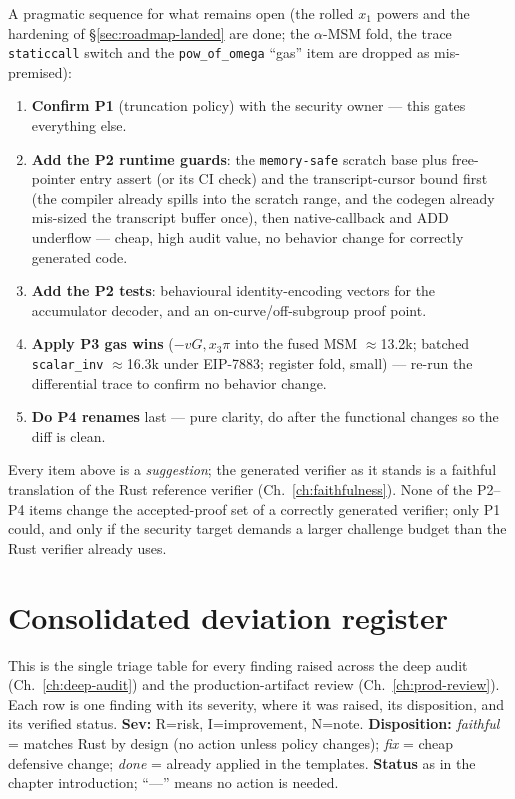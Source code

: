 A pragmatic sequence for what remains open (the rolled $x_1$ powers and
the hardening of \S\ref{sec:roadmap-landed} are done; the $\alpha$-MSM
fold, the trace \texttt{staticcall} switch and the
\texttt{pow\_of\_omega} ``gas'' item are dropped as mis-premised):
\begin{enumerate}[leftmargin=1.4em,itemsep=1pt]
  \item \textbf{Confirm P1} (truncation policy) with the security
        owner --- this gates everything else.
  \item \textbf{Add the P2 runtime guards}: the \texttt{memory-safe}
        scratch base plus free-pointer entry assert (or its CI check) and
        the transcript-cursor bound first (the compiler already spills
        into the scratch range, and the codegen already mis-sized the
        transcript buffer once), then
        native-callback and ADD underflow --- cheap, high audit value,
        no behavior change for correctly generated code.
  \item \textbf{Add the P2 tests}: behavioural identity-encoding vectors
        for the accumulator decoder, and an on-curve/off-subgroup proof
        point.
  \item \textbf{Apply P3 gas wins} ($-vG,x_3\pi$ into the fused MSM
        $\approx$13.2k; batched \texttt{scalar\_inv} $\approx$16.3k under EIP-7883;
        register fold, small) --- re-run the differential trace to
        confirm no behavior change.
  \item \textbf{Do P4 renames} last --- pure clarity, do after the
        functional changes so the diff is clean.
\end{enumerate}

Every item above is a \emph{suggestion}; the generated verifier as it
stands is a faithful translation of the Rust reference verifier
(Ch.~\ref{ch:faithfulness}). None of the P2--P4 items change the
accepted-proof set of a correctly generated verifier; only P1 could, and
only if the security target demands a larger challenge budget than the
Rust verifier already uses.

\section{Consolidated deviation register}
\label{sec:deviation-register}

This is the single triage table for every finding raised across the deep
audit (Ch.~\ref{ch:deep-audit}) and the production-artifact review
(Ch.~\ref{ch:prod-review}). Each row is one finding with its severity,
where it was raised, its disposition, and its verified status.
\textbf{Sev:}
\textcolor{rustorange}{R}=risk, \textcolor{codegenblue}{I}=improvement,
\textcolor{mathpurple}{N}=note. \textbf{Disposition:} \emph{faithful} =
matches Rust by design (no action unless policy changes); \emph{fix} =
cheap defensive change; \emph{done} = already applied in the templates.
\textbf{Status} as in the chapter introduction; ``---'' means no action
is needed.

